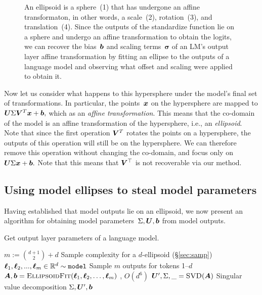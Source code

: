 \documentclass{article}
\begin{document}
\begin{figure}
  \centering
  
  \caption{
    An ellipsoid is a sphere~(1) that has undergone an affine transformaton, in other words, a scale~(2), rotation~(3), and translation~(4).
    Since the outputs of the standardize function lie on a sphere
    and undergo an affine transformation to obtain the logits,
    we can recover the bias~\({\bm{b}}\) and scaling terms~\(\boldsymbol\sigma\)
    of an LM's output layer affine transformation
    by fitting an ellipse to the outputs of a language model 
    and observing what offset and scaling were applied to obtain it.
  }
\end{figure}

Now let us consider what happens to this hypersphere under the model's final set of transformations.
In particular, the points~\({\bm{x}}\) on the hypersphere are mapped to 
\({\bm{U}}\Sigma{\bm{V}}^T{\bm{x}} + {\bm{b}},\)
which as an \emph{affine transformation}.
This means that the co-domain of the model is an affine transformation of the hypersphere, i.e., an \emph{ellipsoid}.
Note that since the first operation \({\bm{V}}^T\) rotates the points on a hypersphere,
the outputs of this operation will still be on the hypersphere.
We can therefore remove this operation without changing the co-domain, 
and focus only on \({\bm{U}}\Sigma{\bm{x}} + {\bm{b}}.\)
Note that this means that \({\bm{V}}^\top\) is not recoverable via our method.

\subsection{Using model ellipses to steal model parameters}

Having established that model outputs lie on an ellipsoid, we now present an algorithm for obtaining model parameters~\(\Sigma,{\bm{U}},{\bm{b}}\) from model outputs.

\begin{algorithm}
  \caption{Get output layer parameters of a language model.}
\begin{algorithmic}
  \State \(m:=\binom{d+1}{2}+d\)
  \Comment Sample complexity for a \(d\)-ellipsoid (\S\ref{sec:samp})
  \State \({\bm{\ell}}_1,{\bm{\ell}}_2,...,{\bm{\ell}}_m\in\mathbb{R}^d\sim\texttt{model}\)
  \Comment Sample \(m\) outputs for tokens 1--\(d\)
  \State \({\bm{A}},{\bm{b}} = \textsc{EllipsoidFit}({\bm{\ell}}_1,{\bm{\ell}}_2,\ldots,{\bm{\ell}}_m)\)
  \Comment \citep{Lin2016FastME}, \(O(d^6)\)
  \State \({\bm{U}}', \Sigma, \_ = \textsc{SVD}({\bm{A}})\)
  \Comment Singular value decomposition
  \State \Return \(\Sigma, {\bm{U}}', {\bm{b}}\)
  \EndFunction
\end{algorithmic}
\end{algorithm}
\end{document}
